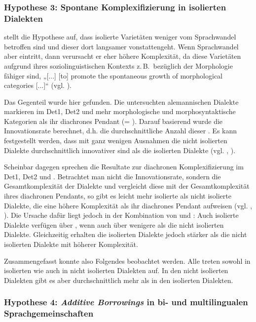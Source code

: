 \subsubsection{Hypothese 3: Spontane Komplexifizierung in isolierten Dialekten}

\citet{Trudgill2011} stellt die Hypothese auf, dass isolierte Varietäten weniger vom Sprachwandel betroffen sind und dieser dort langsamer vonstattengeht. Wenn Sprachwandel aber eintritt, dann verursacht er eher höhere Komplexität, da diese Varietäten aufgrund ihres soziolinguistischen Kontexts z.\,B.\ bezüglich der Morphologie fähiger sind, „[...] [to] promote the spontaneous growth of morphological categories [...]“ \citep[109]{Trudgill2009} (vgl. ).

Das Gegenteil wurde hier gefunden. Die untersuchten alemannischen Dialekte markieren im Det1, Det2 und  mehr morphologische und morphosyntaktische Kategorien als ihr diachrones Pendant (= ). Darauf basierend wurde die Innovationsrate berechnet, d.h. die durchschnittliche Anzahl dieser . Es kann festgestellt werden, dass mit ganz wenigen Ausnahmen die nicht isolierten Dialekte durchschnittlich innovativer sind als die isolierten Dialekte (vgl. , ).

Scheinbar dagegen sprechen die Resultate zur diachronen Komplexifizierung im Det1, Det2 und . Betrachtet man nicht die Innovationsrate, sondern die Gesamtkomplexität der Dialekte und vergleicht diese mit der Gesamtkomplexität ihres diachronen Pendants, so gibt es leicht mehr isolierte als nicht isolierte Dialekte, die eine höhere Komplexität als ihr diachrones Pendant aufweisen (vgl. , ). Die Ursache dafür liegt jedoch in der Kombination von  und : Auch isolierte Dialekte verfügen über , wenn auch über wenigere als die nicht isolierten Dialekte. Gleichzeitig erhalten die isolierten Dialekte jedoch stärker als die nicht isolierten Dialekte  mit höherer Komplexität.

Zusammengefasst konnte also Folgendes beobachtet werden. Alle  treten sowohl in isolierten wie auch in nicht isolierten Dialekten auf. In den nicht isolierten Dialekten gibt es aber durchschnittlich mehr  als in den isolierten Dialekten.

\subsubsection{Hypothese 4: \textit{Additive Borrowings} {in bi- und multilingualen Sprachgemeinschaften}}

